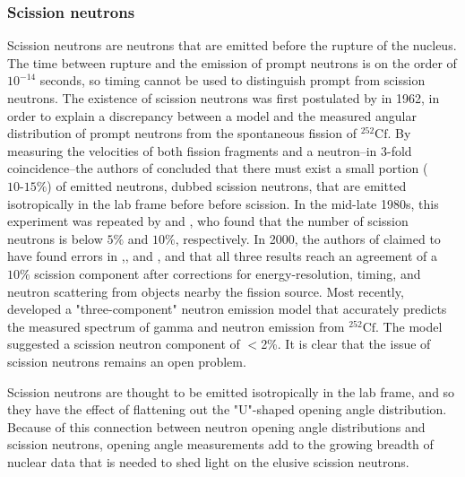 \subsubsection{Scission neutrons} 
Scission neutrons are neutrons that are emitted before the rupture of the nucleus. The time between rupture and the emission of prompt neutrons is on the order of $10^{-14}$ seconds, so timing cannot be used to distinguish prompt from scission neutrons. The existence of scission neutrons was first postulated by \cite{Bowman} in 1962, in order to explain a discrepancy between a model and the measured angular distribution of prompt neutrons from the spontaneous fission of $^{252}\text{Cf}$. By measuring the velocities of both fission fragments and a neutron--in 3-fold coincidence--the authors of \cite{Bowman} concluded that there must exist a small portion ($\text{10-15\%}$) of emitted neutrons, dubbed scission neutrons, that are emitted isotropically in the lab frame before before scission. In the mid-late 1980s, this experiment was repeated by \cite{seregina1985} and \cite{JORGENSEN}, who found that the number of scission neutrons is below $5\%$ and $10\%$, respectively. In 2000, the authors of \cite{KORNILOV2001} claimed to have found errors in \cite{Bowman},\cite{JORGENSEN}, and \cite{seregina1985}, and that all three results reach an agreement of a $10\%$ scission component after corrections for energy-resolution, timing, and neutron scattering from objects nearby the fission source. Most recently, \cite{serot2017influence} developed a "three-component" neutron emission model that accurately predicts the measured spectrum of gamma and neutron emission from $^{252}\text{Cf}$. The model suggested a scission neutron component of $<$2\%. It is clear that the issue of scission neutrons remains an open problem. 

Scission neutrons are thought to be emitted isotropically in the lab frame, and so they have the effect of flattening out the "U"-shaped opening angle distribution. Because of this connection between neutron opening angle distributions and scission neutrons, opening angle measurements add to the growing breadth of nuclear data that is needed to shed light on the elusive scission neutrons.
